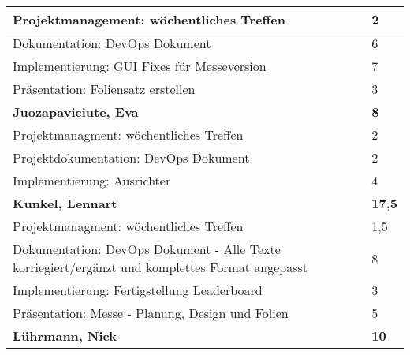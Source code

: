 \documentclass[a4paper,11pt]{scrartcl}
\begin{document}
\begin{longtable}{| p{13.8cm} | C{2.4cm} |}
	Projektmanagement: wöchentliches Treffen
	&
	2
	\\
	\hline

	Dokumentation: DevOps Dokument
	&
	6
	\\
	\hline

  Implementierung: GUI Fixes für Messeversion
	&
  7
	\\
	\hline

  Präsentation: Foliensatz erstellen
	&
  3
	\\
	\hline
	\hline


	\textbf{Juozapaviciute, Eva} & \textbf{8}\\ %
	\hline

  Projektmanagment: wöchentliches Treffen
	&
  2
	\\
	\hline

  Projektdokumentation: DevOps Dokument
	&
  2
	\\
	\hline
	
  Implementierung: Ausrichter
	&
  4
	\\
	\hline
	\hline


	\textbf{Kunkel, Lennart} & \textbf{17,5}\\ %
	\hline

  Projektmanagment: wöchentliches Treffen
	&
  1,5
	\\
	\hline

  Dokumentation: DevOps Dokument - Alle Texte korriegiert/ergänzt und komplettes Format angepasst
	&
  8
	\\
	\hline

  Implementierung: Fertigstellung Leaderboard
	&
  3
	\\
	\hline

  Präsentation: Messe - Planung, Design und Folien
	&
  5
	\\
	\hline
	\hline


	\textbf{Lührmann, Nick} & \textbf{10}\\ %
	\hline


\end{longtable}
\end{document}
